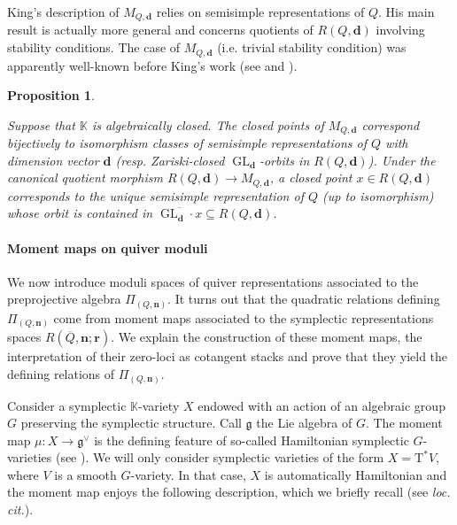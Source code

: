\documentclass[11pt,english]{article}
\numberwithin{equation}{section}
\numberwithin{figure}{section}
\theoremstyle{definition}
\theoremstyle{plain}
\newtheorem{prop}[df]{Proposition}
\theoremstyle{remark}
\DeclareMathOperator{\GL}{GL}
\newcommand\dd{\mathbf{d}}
\newcommand\nn{\mathbf{n}}
\newcommand\rr{\mathbf{r}}
\newcommand\KK{\mathbb{K}}
\begin{document}
King's description of $M_{Q,\dd}$ relies on semisimple representations
of $Q$. His main result is actually more general and concerns quotients
of $R(Q,\dd)$ involving stability conditions. The case of $M_{Q,\dd}$
(i.e. trivial stability condition) was apparently well-known before
King's work (see \cite{LBP90} and \cite[\S 3.]{CB92}).

\begin{prop}{\cite[\S 2., Prop. 3.2.]{Kin94}}

Suppose that $\KK$ is algebraically closed. The closed points of
$M_{Q,\dd}$ correspond bijectively to isomorphism classes of semisimple
representations of $Q$ with dimension vector $\dd$ (resp. Zariski-closed
$\GL_{\dd}$-orbits in $R(Q,\dd)$). Under the canonical quotient
morphism $R(Q,\dd)\rightarrow M_{Q,\dd}$, a closed point $x\in R(Q,\dd)$
corresponds to the unique semisimple representation of $Q$ (up to
isomorphism) whose orbit is contained in $\overline{\GL_{\dd}\cdot x}\subseteq R(Q,\dd)$.

\end{prop}

\paragraph*{Moment maps on quiver moduli}

We now introduce moduli spaces of quiver representations associated
to the preprojective algebra $\Pi_{(Q,\nn)}$. It turns out that the
quadratic relations defining $\Pi_{(Q,\nn)}$ come from moment maps
associated to the symplectic representations spaces $R(\overline{Q},\nn;\rr)$.
We explain the construction of these moment maps, the interpretation
of their zero-loci as cotangent stacks and prove that they yield the
defining relations of $\Pi_{(Q,\nn)}$.

Consider a symplectic $\KK$-variety $X$ endowed with an action of
an algebraic group $G$ preserving the symplectic structure. Call
$\mathfrak{g}$ the Lie algebra of $G$. The moment map $\mu:X\rightarrow\mathfrak{g}^{\vee}$
is the defining feature of so-called Hamiltonian symplectic $G$-varieties
(see \cite[\S 1.4.]{CG97}). We will only consider symplectic varieties
of the form $X=\mathrm{T}^{*}V$, where $V$ is a smooth $G$-variety.
In that case, $X$ is automatically Hamiltonian and the moment map
enjoys the following description, which we briefly recall (see \textit{loc.
cit.}).
\end{document}
